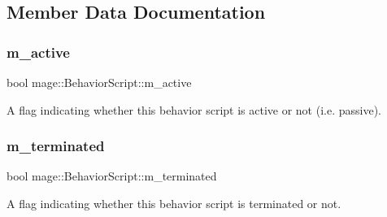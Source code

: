 \subsection{Member Data Documentation}
\hypertarget{classmage_1_1_behavior_script_a18f81792aed31a2d61a8a75784e2ceef}{}\label{classmage_1_1_behavior_script_a18f81792aed31a2d61a8a75784e2ceef} 
\subsubsection{\texorpdfstring{m\+\_\+active}{m\_active}}
{\footnotesize\ttfamily bool mage\+::\+Behavior\+Script\+::m\+\_\+active\hspace{0.3cm}{\ttfamily [private]}}

A flag indicating whether this behavior script is active or not (i.\+e. passive). \hypertarget{classmage_1_1_behavior_script_abc4a0e6728787347012404a597ab8e07}{}\label{classmage_1_1_behavior_script_abc4a0e6728787347012404a597ab8e07} 
\subsubsection{\texorpdfstring{m\+\_\+terminated}{m\_terminated}}
{\footnotesize\ttfamily bool mage\+::\+Behavior\+Script\+::m\+\_\+terminated\hspace{0.3cm}{\ttfamily [private]}}

A flag indicating whether this behavior script is terminated or not. 